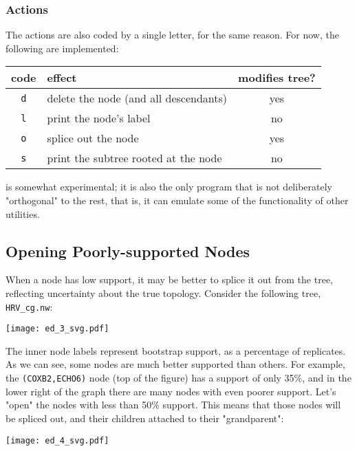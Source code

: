 \subsubsection{Actions}

The actions are also coded by a single letter, for the same reason. For now,
the following are implemented:

\begin{center}
\begin{tabular}{clc}
code & effect & modifies tree?\\
\hline
\texttt{d} & delete the node (and all descendants) & yes \\
\texttt{l} & print the node's label & no \\
\texttt{o} & splice out the node & yes \\
\texttt{s} & print the subtree rooted at the node & no \\
\end{tabular}
\end{center}

\ed{} is somewhat experimental; it is also the only program that is not
deliberately "orthogonal" to the rest, that is, it can emulate some of the
functionality of other utilities.

\subsection{Opening Poorly-supported Nodes}
\label{sct:ed_ed}

When a node has low support, it may be better to splice it out from the tree,
reflecting uncertainty about the true topology. Consider the following tree, 
\texttt{HRV\_cg.nw}:

\begin{center}
\texttt{[image: ed\_3\_svg.pdf]}
\end{center}

\noindent{}The inner node labels represent bootstrap support, as a percentage of
replicates. As we can see, some nodes are much better supported than others.
For example, the \texttt{(COXB2,ECHO6)} node (top of the figure) has a support
of only 35\%, and in the lower right of the graph there are many nodes with even
poorer support. Let's "open" the nodes with less than 50\% support. This means
that those nodes will be spliced out, and their children attached to their
"grandparent":


\begin{center}
\texttt{[image: ed\_4\_svg.pdf]}
\end{center}

